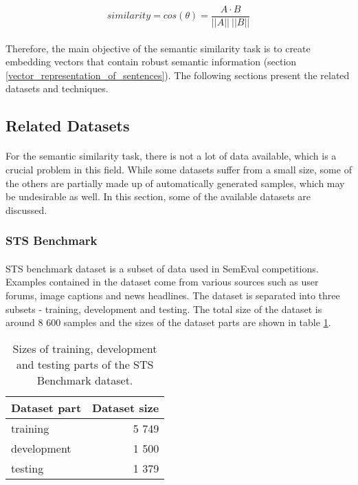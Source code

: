 \begin{equation}
similarity = cos(\theta) = \frac{A \cdot B}{||A|| \: ||B||}
\label{cosine_similarity_eq}
\end{equation}

\paragraph{}
Therefore, the main objective of the semantic similarity task is to create embedding vectors that contain robust semantic information (section \ref{vector_representation_of_sentences}). The following sections present the related datasets and techniques.

\subsection{Related Datasets}\label{semantic_similarity_datasets}
\paragraph{}
For the semantic similarity task, there is not a lot of data available, which is a crucial problem in this field. While some datasets suffer from a small size, some of the others are partially made up of automatically generated samples, which may be undesirable as well. In this section, some of the available datasets are discussed.

\subsubsection{STS Benchmark}
\paragraph{}
STS benchmark dataset \cite{STSbenchmark} is a subset of data used in SemEval competitions. Examples contained in the dataset come from various sources such as user forums, image captions and news headlines. The dataset is separated into three subsets - training, development and testing. The total size of the dataset is around 8 600 samples and the sizes of the dataset parts are shown in table \ref{STSbenchmark_counts}.

\begin{table}[h!]
	\begin{center}
		\begin{tabular}{l r} 
			\hline
			\textbf{Dataset part} & \textbf{Dataset size} \\ [0.5ex] 
			\hline\hline
			training & 5 749 \\ 
			development & 1 500 \\
			testing & 1 379 \\ 
			\hline
		\end{tabular}
	\end{center}
	\caption{Sizes of training, development and testing parts of the STS Benchmark dataset.}
	\label{STSbenchmark_counts}
\end{table}

